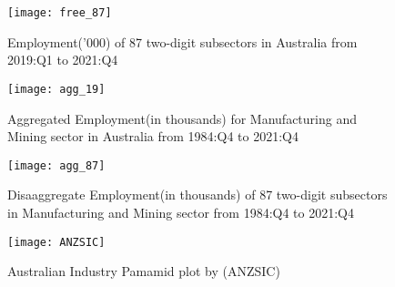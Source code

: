\documentclass{monashthesis}
\begin{document}
\begin{figure}[t]
\texttt{[image: free\_87]}
\centering
\caption{Employment('000) of 87 two-digit subsectors in Australia from 2019:Q1 to 2021:Q4}
\label{fig:87}
\end{figure}

\begin{figure}[t]
\texttt{[image: agg\_19]}
\centering
\caption{Aggregated Employment(in thousands) for Manufacturing and Mining sector in Australia from 1984:Q4 to 2021:Q4}
\label{fig:a19}
\end{figure}

\begin{figure}[t]
\texttt{[image: agg\_87]}
\centering
\caption{Disaaggregate Employment(in thousands) of 87 two-digit subsectors in Manufacturing and Mining sector from 1984:Q4 to 2021:Q4}
\label{fig:a87}
\end{figure}

\begin{figure}[t]
\texttt{[image: ANZSIC]}
\centering
\caption{Australian Industry Pamamid plot by (ANZSIC)}
\label{fig:anzsic}
\end{figure}

\printbibliography[heading=bibintoc]
\end{document}
